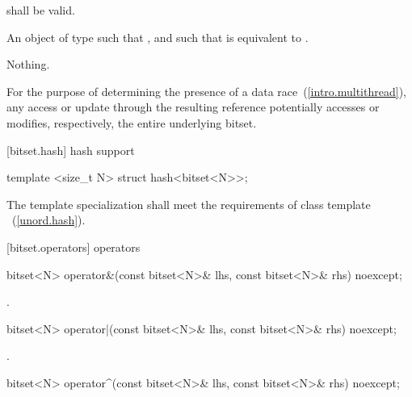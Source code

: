 \begin{itemdescr}
\pnum
\requires
{} shall be valid.

\pnum
\returns
An object of type
such that
,
and such that
is equivalent to
.

\pnum
\throws Nothing.

\pnum
\remark For the purpose of determining the presence of a data
race~(\ref{intro.multithread}), any access or update through the resulting
reference potentially accesses or modifies, respectively, the entire
underlying bitset.
\end{itemdescr}

[bitset.hash]{ hash support}

%
\begin{itemdecl}
template <size_t N> struct hash<bitset<N>>;
\end{itemdecl}

\begin{itemdescr}
\pnum The template specialization shall meet the requirements of class template
~(\ref{unord.hash}).
\end{itemdescr}


[bitset.operators]{ operators}

%
\begin{itemdecl}
bitset<N> operator&(const bitset<N>& lhs, const bitset<N>& rhs) noexcept;
\end{itemdecl}

\begin{itemdescr}
\pnum
\returns
{}.
\end{itemdescr}

%
\begin{itemdecl}
bitset<N> operator|(const bitset<N>& lhs, const bitset<N>& rhs) noexcept;
\end{itemdecl}

\begin{itemdescr}
\pnum
\returns
{}.
\end{itemdescr}

%
\begin{itemdecl}
bitset<N> operator^(const bitset<N>& lhs, const bitset<N>& rhs) noexcept;
\end{itemdecl}

